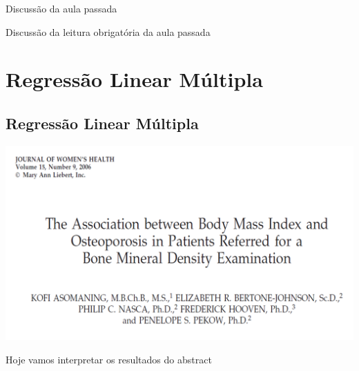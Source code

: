 \documentclass{beamer}
\begin{document}

\begin{frame}{\scriptsize Discussão da aula passada}
  \begin{block}{}
    Discussão da leitura obrigatória da aula passada
  \end{block}
\end{frame}

\section{Regressão Linear Múltipla}

\subsection{Regressão Linear Múltipla}

\begin{frame}{\scriptsize }
  \begin{center}
    \includegraphics[width=\textwidth]{Cap18-19/bmi-bmd-title}
  \end{center}
\end{frame}

\begin{frame}{\scriptsize }
  \begin{center}
    Hoje vamos interpretar os resultados do abstract
  \end{center}
\end{frame}
\end{document}
